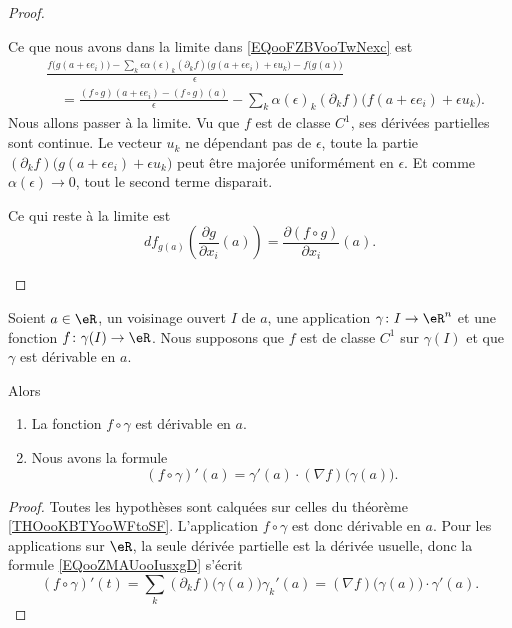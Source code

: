 \begin{proof}
\begin{subproof}
\begin{equation}
		\end{equation}
		Ce que nous avons dans la limite dans \eqref{EQooFZBVooTwNexc} est
		\begin{subequations}
			\begin{align}
				 & \frac{ f\big( g(a+\epsilon e_i)\big)-\sum_k\epsilon\alpha(\epsilon)_k (\partial_kf)\big( g(a+\epsilon e_i)+\epsilon u_k \big)-f\big( g(a) \big) }{ \epsilon } \\
				 & \quad=\frac{ (f\circ g)(a+\epsilon e_i)-(f\circ g)(a) }{ \epsilon }
				-\sum_k\alpha(\epsilon)_k(\partial_kf)\big( f(a+\epsilon e_i)+\epsilon u_k \big).
			\end{align}
		\end{subequations}
		Nous allons passer à la limite. Vu que \( f\) est de classe \( C^1\), ses dérivées partielles sont continue. Le vecteur \( u_k\) ne dépendant pas de \( \epsilon\), toute la partie \( (\partial_kf)\big( g(a+\epsilon e_i)+\epsilon u_k \big)\) peut être majorée uniformément en \( \epsilon\). Et comme \( \alpha(\epsilon)\to 0\), tout le second terme disparait.

		Ce qui reste à la limite est
		\begin{equation}
			df_{g(a)}\left( \frac{ \partial g }{ \partial x_i }(a) \right)=\frac{ \partial (f\circ g) }{ \partial x_i }(a).
		\end{equation}
	\end{subproof}
\end{proof}

\begin{corollary}		\label{CORooNQURooAWjfcA}
	Soient \( a\in \eR\), un voisinage ouvert \( I\) de \( a\), une application \(\gamma \colon I\to \eR^n  \) et une fonction \(f \colon \gamma(I)\to \eR  \). Nous supposons que \( f\) est de classe \( C^1\) sur \( \gamma(I)\) et que \( \gamma\) est dérivable en \( a\).

	Alors
	\begin{enumerate}
		\item
		      La fonction \( f\circ \gamma\) est dérivable en \( a\).
		\item
		      Nous avons la formule
		      \begin{equation}
			      (f\circ \gamma)'(a)=\gamma'(a)\cdot (\nabla f)\big( \gamma(a) \big).
		      \end{equation}
	\end{enumerate}
\end{corollary}

\begin{proof}
	Toutes les hypothèses sont calquées sur celles du théorème \ref{THOooKBTYooWFtoSF}. L'application \( f\circ \gamma\) est donc dérivable en \( a\). Pour les applications sur \( \eR\), la seule dérivée partielle est la dérivée usuelle, donc la formule \eqref{EQooZMAUooIusxgD} s'écrit
	\begin{equation}
		(f\circ \gamma)'(t)=\sum_k(\partial_kf)\big( \gamma(a) \big)\gamma_k'(a)=(\nabla f)\big( \gamma(a) \big)\cdot \gamma'(a).
	\end{equation}
\end{proof}

